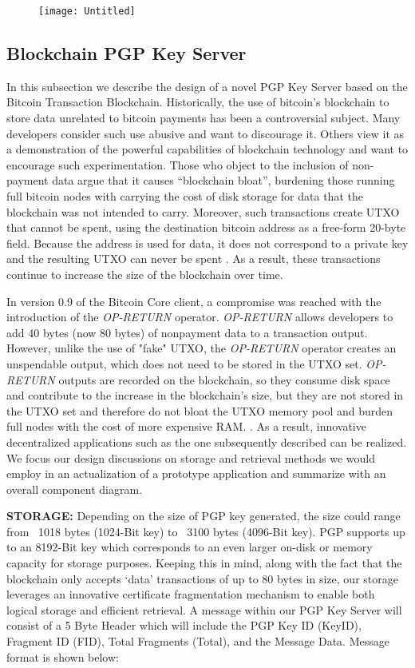 \documentclass{llncs}
\begin{document}
\begin{figure}[h]
\centering  \texttt{[image: Untitled]}
\end{figure}

\subsection{Blockchain PGP Key Server}
In this subsection we describe the design of a novel PGP Key Server based on the Bitcoin Transaction Blockchain.  Historically, the use of bitcoin’s blockchain to store data unrelated to bitcoin payments has been a controversial subject. Many developers consider such use abusive and want to discourage it. Others view it as a demonstration of the powerful capabilities of blockchain technology and want to encourage such experimentation. Those who object to the inclusion of non-payment data argue that it causes ``blockchain bloat'', burdening those running full bitcoin nodes with carrying the cost of disk storage for data that the blockchain was not intended to carry. Moreover, such transactions create UTXO that cannot be spent, using the destination bitcoin address as a free-form 20-byte field. Because the address is used for data, it does not correspond to a private key and the resulting UTXO can never be spent \cite{chimera}. As a result, these transactions continue to increase the size of the blockchain over time.  

In version 0.9 of the Bitcoin Core client, a compromise was reached with the introduction of the \textit{OP-RETURN} operator. \textit{OP-RETURN} allows developers to add 40 bytes (now 80 bytes) of nonpayment data to a transaction output. However, unlike the use of "fake" UTXO, the 
\textit{OP-RETURN} operator creates an unspendable output, which does not need to be stored in the UTXO set. \textit{OP-RETURN} outputs are recorded on the blockchain, so they consume disk space and contribute to the increase in the blockchain’s size, but they are not stored in the UTXO set and therefore do not bloat the UTXO memory pool and burden full nodes with the cost of more expensive RAM. \cite{chimera}.  As a result, innovative decentralized applications such as the one subsequently described can be realized.  We focus our design discussions on storage and retrieval methods we would employ in an actualization of a prototype application and summarize with an overall component diagram. 

\textbf{STORAGE: } Depending on the size of PGP key generated, the size could range from ~1018 bytes (1024-Bit key) to ~3100 bytes (4096-Bit key).  PGP supports up to an 8192-Bit key which corresponds to an even larger on-disk or memory capacity for storage purposes. Keeping this in mind, along with the fact that the blockchain only accepts `data' transactions of up to 80 bytes in size, our storage leverages an innovative certificate fragmentation mechanism to enable both logical storage and efficient retrieval.  A message within our PGP Key Server will consist of a 5 Byte Header which will include the PGP Key ID (KeyID), Fragment ID (FID), Total Fragments (Total), and the Message Data.  Message format is shown below: 
\end{document}
